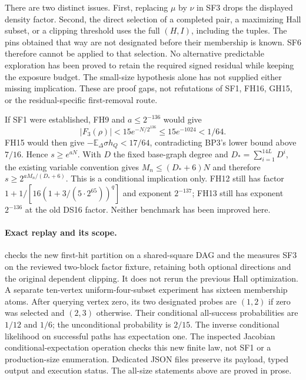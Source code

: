\documentclass[11pt]{article}
\newcommand{\E}{\mathbb E}
\begin{document}
There are two distinct issues. First, replacing $\mu$ by $\nu$
in SF3 drops the displayed density factor. Second, the direct
selection of a completed pair, a maximizing Hall subset, or a
clipping threshold uses the full $(H,I)$, including the tuples.
The pins obtained that way are not designated before their membership
is known. SF6 therefore cannot be applied to that selection.
No alternative predictable exploration has been proved to retain
the required signed residual while keeping the exposure budget.
The small-size hypothesis alone has not supplied either missing
implication. These are proof gaps, not refutations of SF1, FH16,
GH15, or the residual-specific first-removal route.

If SF1 were established, FH9 and $a\le2^{-136}$ would give
\[
 |F_3(\rho)|<15e^{-N/2^{136}}\le15e^{-1024}<1/64.
\]
FH15 would then give $-\E_\Delta\sigma h_Q<17/64$, contradicting
BP3's lower bound above $7/16$. Hence $s\ge e^{aN}$.
With $D$ the fixed base-graph degree and
$D_*=\sum_{i=1}^{14L}D^i$, the existing variable convention gives
$M_n\le(D_*+6)N$ and therefore
$s\ge2^{aM_n/(D_*+6)}$. This is a conditional implication only.
FH12 still has factor
$1+1/[16(1+3/(5\cdot2^{65}))^q]$ and exponent $2^{-137}$;
FH13 still has exponent $2^{-136}$ at the old DS16 factor.
Neither benchmark has been improved here.

\paragraph{Exact replay and its scope.}
 checks the new first-hit partition
on a shared-square DAG and the measures SF3 on the reviewed two-block
factor fixture, retaining both optional directions and the original
dependent clipping. It does not rerun the previous Hall optimization.
A separate ten-vertex uniform-four-subset experiment has sixteen
membership atoms. After querying vertex zero, its two designated
probes are $(1,2)$ if zero was selected and $(2,3)$ otherwise.
Their conditional all-success probabilities are $1/12$ and $1/6$;
the unconditional probability is $2/15$. The inverse conditional
likelihood on successful paths has expectation one.
The inspected Jacobian conditional-expectation operation checks
this new finite law, not SF1 or a production-size enumeration.
Dedicated JSON files preserve its payload, typed output and execution
status. The all-size statements above are proved in prose.
\end{document}
